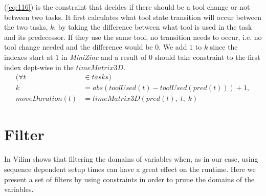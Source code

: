   \noindent (\ref{eq:116}) is the constraint that decides if there should be a tool change or not between two tasks. It first calculates what tool state transition will occur between the two tasks, $k$, by taking the difference between what tool is used in the task and its predecessor. If they use the same tool, no transition needs to occur, i.e. no tool change needed and the difference would be $0$. We add $1$ to $k$ since the indexes start at $1$ in \emph{MiniZinc} and a result of $0$ should take constraint to the first index dept-wise in the $timeMatrix3D$.
 \begin{equation}\label{eq:116}
 \begin{aligned}
 (\forall t &\in tasks) \\
 k &= abs(toolUsed(t) - toolUsed(pred(t))) + 1, \\
 moveDuration(t) &= timeMatrix3D(pred(t), \; t, \; k)
 \end{aligned}
 \end{equation}
 
 \newpage
 
 \section{Filter}
  In \cite{VilimBartak2002Batch} \cite{Vilim2002Precedence} \cite{VilimBartak2002Sequence} Vilím shows that filtering the domains of variables when, as in our case, using sequence dependent setup times can have a great effect on the runtime. Here we present a set of filters by using constraints in order to prune the domains of the variables.
  
